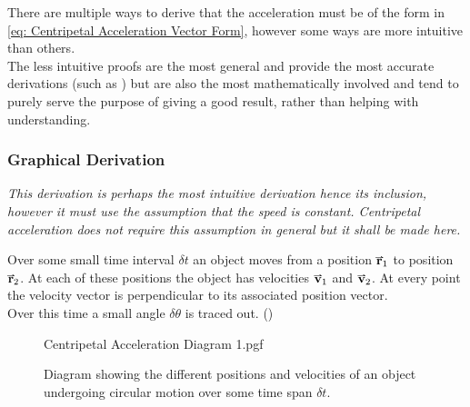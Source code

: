 \documentclass[main.tex]{subfiles}
\begin{document}
                There are multiple ways to derive that the acceleration must be of the form in \eqref{eq: Centripetal Acceleration Vector Form}, however some ways are more intuitive than others.\\
                The less intuitive proofs are the most general and provide the most accurate derivations (such as ) but are also the most mathematically involved and tend to purely serve the purpose of giving a good result, rather than helping with understanding.
                

                \newpage
                \subsubsection{Graphical Derivation}
                    \label{subsubsec: Graphical Derivation of Centripetal Acceleration}

                    \textit{This derivation is perhaps the most intuitive derivation hence its inclusion, however it must use the assumption that the speed is constant. Centripetal acceleration does not require this assumption in general but it shall be made here.}

                    Over some small time interval $\delta t$ an object moves from a position $\vect{r}_1$ to position $\vect{r}_2$. At each of these positions the object has velocities $\vect{v}_1$ and $\vect{v}_2$. At every point the velocity vector is perpendicular to its associated position vector.\\
                    Over this time a small angle $\delta \theta$ is traced out. ()

                    \begin{figure}[h]
                        \centering
                        \scalebox{0.9}
                        {
                            \begin{adjustbox}{clip,trim=10mm 25mm 10mm 25mm}
                                {{Centripetal Acceleration Diagram 1.pgf}}
                            \end{adjustbox}
                        }
                        \vspace{-5mm}
                        \caption{Diagram showing the different positions and velocities of an object undergoing circular motion over some time span $\delta t$.}
                        \label{fig: Centripetal Acceleration Motion Diagram}
                    \end{figure}
                    \FloatBarrier
\end{document}

